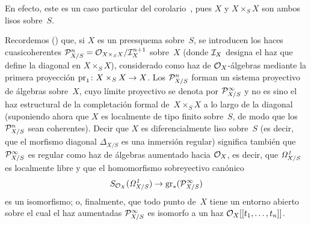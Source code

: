 En efecto, este es un caso particular del corolario~, pues $X$ y $X\times_S X$ son ambos lisos sobre~$S$.

\setcounter{subsection}{17}
\setcounter{proposition}{17}

\begin{remarques}
\label{rem:II.4.18}
Recordemos () que, si $X$ es un preesquema sobre~$S$, se introducen los haces cuasicoherentes
$\cal{P}_{X/S}^n=\cal{O}_{X\times_S X}/\cal{I}_X^{n+1}$ sobre~$X$ (donde $\cal{I}_X$ designa el haz
que define la diagonal en $X\times_S X$), considerado como haz de $\cal{O}_X$-álgebras mediante la primera proyección $\pr_1\colon X\times_S X\to X$. Los $\cal{P}_{X/S}^n$ forman un sistema proyectivo de álgebras sobre~$X$, cuyo límite proyectivo se denota por $\cal{P}_{X/S}^{\infty}$ y no es sino el haz estructural de la completación formal de~$X\times_S X$ a lo largo de la diagonal (suponiendo ahora que $X$ es localmente de tipo finito sobre~$S$, de modo que los $\cal{P}_{X/S}^n$ sean coherentes). Decir que $X$ es diferencialmente liso sobre~$S$ (es decir, que el morfismo diagonal $\Delta_{X/S}$ es una inmersión regular) significa también que $\cal{P}_{X/S}^{\infty}$ es regular como haz de álgebras aumentado hacia $\cal{O}_X$, es decir, que $\it{\Omega}_{X/S}^1$ es localmente libre y que el homomorfismo sobreyectivo canónico
\[
S_{\cal{O}_X}(\it{\Omega}_{X/S}^1)\to
\mathrm{gr}_*(\cal{P}_{X/S}^{\infty})
\]
es un isomorfismo; o, finalmente, que todo punto de~$X$ tiene
un entorno abierto sobre el cual el haz
aumentadas $\cal{P}_{X/S}^{\infty}$ es isomorfo a un haz $\cal{O}_X[[t_1,\dots,t_n]]$.


\end{remarques}
